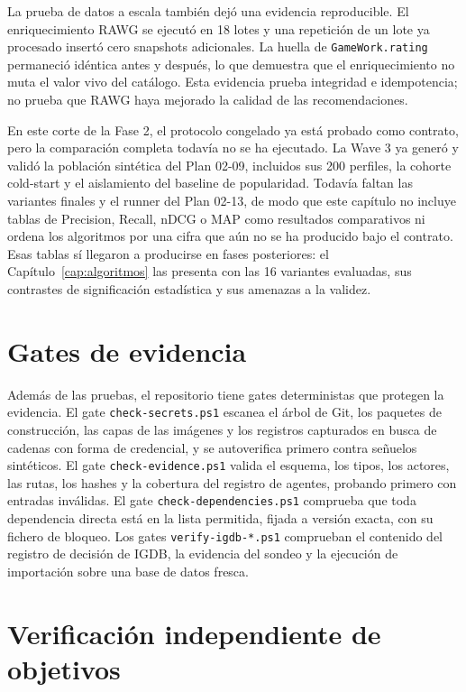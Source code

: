 La prueba de datos a escala también dejó una evidencia reproducible. El enriquecimiento RAWG
se ejecutó en 18 lotes y una repetición de un lote ya procesado insertó cero snapshots
adicionales. La huella de \texttt{GameWork.rating} permaneció idéntica antes y después, lo
que demuestra que el enriquecimiento no muta el valor vivo del catálogo. Esta evidencia
prueba integridad e idempotencia; no prueba que RAWG haya mejorado la calidad de las
recomendaciones.

En este corte de la Fase 2, el protocolo congelado ya está probado como contrato, pero la
comparación completa todavía no se ha ejecutado. La Wave 3 ya generó y validó la población
sintética del Plan 02-09, incluidos sus 200 perfiles, la cohorte cold-start y el aislamiento
del baseline de popularidad. Todavía faltan las variantes finales y el runner del Plan 02-13,
de modo que este capítulo no incluye tablas de Precision, Recall, nDCG o MAP como resultados
comparativos ni ordena los algoritmos por una cifra que aún no se ha producido bajo el
contrato. Esas tablas sí llegaron a producirse en fases posteriores: el
Capítulo~\ref{cap:algoritmos} las presenta con las 16 variantes evaluadas, sus contrastes de
significación estadística y sus amenazas a la validez.

\section{Gates de evidencia}\label{sec:pru-gates}

Además de las pruebas, el repositorio tiene gates deterministas que protegen la evidencia. El
gate \texttt{check-secrets.ps1} escanea el árbol de Git, los paquetes de construcción, las
capas de las imágenes y los registros capturados en busca de cadenas con forma de credencial,
y se autoverifica primero contra señuelos sintéticos. El gate \texttt{check-evidence.ps1}
valida el esquema, los tipos, los actores, las rutas, los hashes y la cobertura del registro
de agentes, probando primero con entradas inválidas. El gate \texttt{check-dependencies.ps1}
comprueba que toda dependencia directa está en la lista permitida, fijada a versión exacta,
con su fichero de bloqueo. Los gates \texttt{verify-igdb-*.ps1} comprueban el contenido del
registro de decisión de IGDB, la evidencia del sondeo y la ejecución de importación sobre una
base de datos fresca.

\section{Verificación independiente de objetivos}\label{sec:pru-verificacion-fase}

